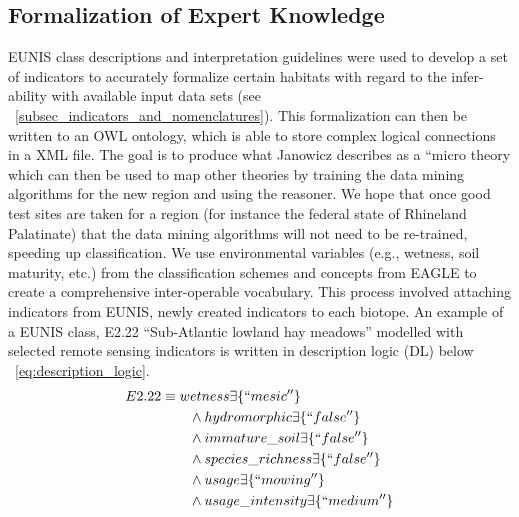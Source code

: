 \documentclass[authoryear, review,12pt,number]{elsarticle}
\begin{document}
\subsection{Formalization of Expert Knowledge}
EUNIS class descriptions and interpretation guidelines \citep{EUNISManual} were
used to develop a set of indicators to accurately formalize certain habitats
with regard to the infer-ability with available input data sets (see
~\ref{subsec_indicators_and_nomenclatures}). This formalization can then be
written to an OWL ontology, which is able to store complex logical connections
in a XML file. The goal is to produce what Janowicz describes
as a ``micro theory \citep{Janowicz2012} which can then be used to map other
theories by training the data mining algorithms for the new
region and using the reasoner. We hope that once good test sites are taken for 
a region (for instance the federal state of Rhineland Palatinate) that the data 
mining algorithms will not need to be re-trained, speeding up classification. 
We use environmental variables (e.g., wetness, soil maturity, etc.) from the 
classification schemes and concepts from EAGLE to create a comprehensive 
inter-operable vocabulary. This process involved attaching indicators from 
EUNIS, newly created indicators to each biotope. An example of a EUNIS class, 
E2.22 ``Sub-Atlantic lowland hay meadows'' modelled with selected remote sensing
indicators is written in description logic (DL) below
~\ref{eq:description_logic}.
\begin{equation}
\begin{align*}
E2.22 &\equiv wetness \exists \{``mesic''\} \\
&\qquad {} \land hydromorphic \exists \{``false''\} \\
&\qquad {} \land immature\_soil \exists \{``false''\} \\
&\qquad {} \land species\_richness \exists \{``false''\} \\
&\qquad {} \land usage \exists \{``mowing''\} \\
&\qquad {} \land usage\_intensity \exists \{``medium''\} \\
\end{align*}
\label{eq:description_logic}
\end{equation}
\end{document}
